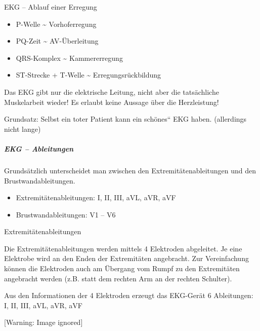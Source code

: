 \documentclass{article}
\begin{document}
EKG -- Ablauf einer Erregung

\begin{itemize}
\item P-Welle \~{} Vorhoferregung

\item PQ-Zeit \~{} AV-\"Uberleitung

\item QRS-Komplex \~{} Kammererregung

\item ST-Strecke + T-Welle \~{} Erregungsr\"uckbildung

\end{itemize}
Das EKG gibt nur die elektrische Leitung, nicht aber die tats\"achliche
Muskelarbeit wieder! Es erlaubt keine Aussage \"uber die Herzleistung! 

Grundsatz: Selbst ein toter Patient kann ein
{\quotedblbase}sch\"ones{\textquotedblleft} EKG haben. (allerdings
nicht lange)

\subparagraph{EKG -- Ableitungen}
Grunds\"atzlich unterscheidet man zwischen den Extremit\"atenableitungen
und den Brustwandableitungen. 

\begin{itemize}
\item Extremit\"atenableitungen: I, II, III, aVL, aVR, aVF

\item Brustwandableitungen: V1 -- V6

\end{itemize}
Extremit\"atenableitungen

Die Extremit\"atenableitungen werden mittels 4 Elektroden abgeleitet. Je
eine Elektrobe wird an den Enden der Extremit\"aten angebracht. Zur
Vereinfachung k\"onnen die Elektroden auch am \"Ubergang vom Rumpf zu
den Extremit\"aten angebracht werden (z.B. statt dem rechten Arm an der
rechten Schulter).

Aus den Informationen der 4 Elektroden erzeugt das EKG-Ger\"at 6
Ableitungen:  I, II, III, aVL, aVR, aVF 

  [Warning: Image ignored] %
 
\end{document}
